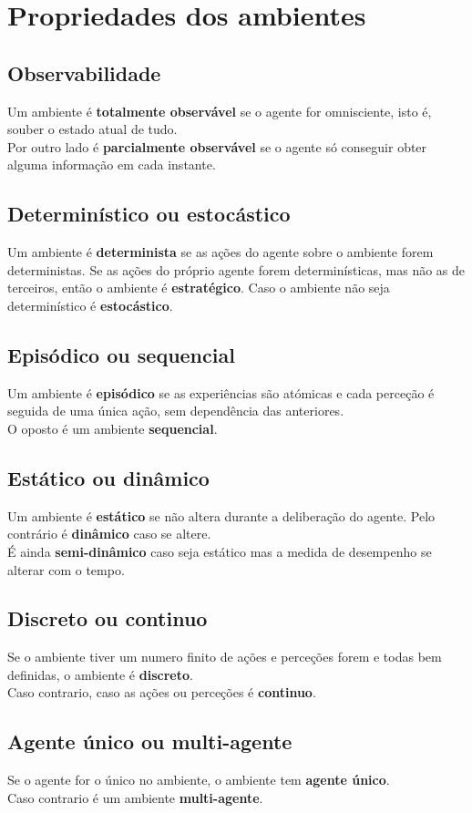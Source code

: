 \documentclass[]{report}
\begin{document}
\section{Propriedades dos ambientes}
\begin{multicols}{2}
\subsection{Observabilidade}
Um ambiente é \textbf{totalmente observável} se o agente for omnisciente, isto é, souber o estado atual de tudo.\\
Por outro lado é \textbf{parcialmente observável} se o agente só conseguir obter alguma informação em cada instante.
\subsection{Determinístico ou estocástico}
Um ambiente é \textbf{determinista} se as ações do agente sobre o ambiente forem deterministas.
Se as ações do próprio agente forem determinísticas, mas não as de terceiros, então o ambiente é \textbf{estratégico}.
Caso o ambiente não seja determinístico é \textbf{estocástico}.
\subsection{Episódico ou sequencial}
Um ambiente é \textbf{episódico} se as experiências são atómicas e cada perceção é seguida de uma única ação, sem dependência das anteriores.\\
O oposto é um ambiente \textbf{sequencial}.
\subsection{Estático ou dinâmico}
Um ambiente é \textbf{estático} se não altera durante a deliberação do agente.
Pelo contrário é \textbf{dinâmico} caso se altere.\\
É ainda \textbf{semi-dinâmico} caso seja estático mas a medida de desempenho se alterar com o tempo.
\subsection{Discreto ou continuo}
Se o ambiente tiver um numero finito de ações e perceções forem e todas bem definidas, o ambiente é \textbf{discreto}.\\
Caso contrario, caso as ações ou perceções é \textbf{continuo}.
\subsection{Agente único ou multi-agente}
Se o agente for o único no ambiente, o ambiente tem \textbf{agente único}.\\
Caso contrario é um ambiente \textbf{multi-agente}.
\end{multicols}
\end{document}
